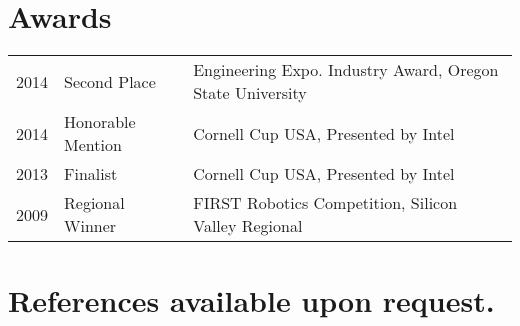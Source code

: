 \documentclass[letterpaper]{deedy-resume} %
\begin{document}
\begin{minipage}[t]{0.66\textwidth}
\section{Awards} 

\begin{tabular}{rll}
2014	 & Second Place & Engineering Expo. Industry Award, Oregon State University\\
2014	 & Honorable Mention & Cornell Cup USA, Presented by Intel\\
2013	 & Finalist & Cornell Cup USA, Presented by Intel\\
2009	 & Regional Winner & FIRST Robotics Competition, Silicon Valley Regional\\
\end{tabular}

\sectionspace %

\section{References available upon request.}

\end{minipage} %








\end{document}
